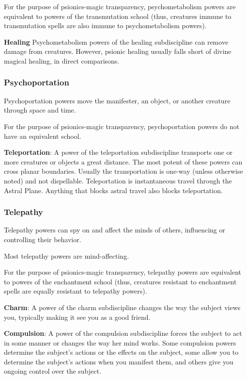 For the purpose of psionics-magic transparency, psychometabolism powers are equivalent to powers of the transmutation school (thus, creatures immune to transmutation spells are also immune to psychometabolism powers).

\textbf{Healing}
Psychometabolism powers of the healing subdiscipline can remove damage from creatures. However, psionic healing usually falls short of divine magical healing, in direct comparisons.

\subsubsection{Psychoportation}
Psychoportation powers move the manifester, an object, or another creature through space and time.

For the purpose of psionics-magic transparency, psychoportation powers do not have an equivalent school.

\textbf{Teleportation}: A power of the teleportation subdiscipline transports one or more creatures or objects a great distance. The most potent of these powers can cross planar boundaries. Usually the transportation is one-way (unless otherwise noted) and not dispellable. Teleportation is instantaneous travel through the Astral Plane. Anything that blocks astral travel also blocks teleportation.

\subsubsection{Telepathy}
Telepathy powers can spy on and affect the minds of others, influencing or controlling their behavior.

Most telepathy powers are mind-affecting.

For the purpose of psionics-magic transparency, telepathy powers are equivalent to powers of the enchantment school (thus, creatures resistant to enchantment spells are equally resistant to telepathy powers).

\textbf{Charm}: A power of the charm subdiscipline changes the way the subject views you, typically making it see you as a good friend.

\textbf{Compulsion}: A power of the compulsion subdiscipline forces the subject to act in some manner or changes the way her mind works. Some compulsion powers determine the subject's actions or the effects on the subject, some allow you to determine the subject's actions when you manifest them, and others give you ongoing control over the subject.